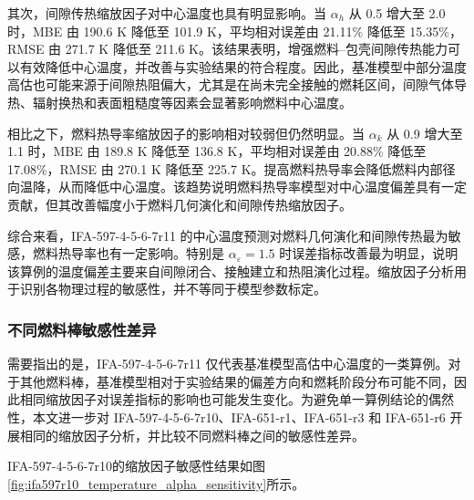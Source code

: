 其次，间隙传热缩放因子对中心温度也具有明显影响。当 \(\alpha_h\) 从 0.5 增大至 2.0 时，MBE 由 190.6 K 降低至 101.9 K，平均相对误差由 21.11\% 降低至 15.35\%，RMSE 由 271.7 K 降低至 211.6 K。该结果表明，增强燃料--包壳间隙传热能力可以有效降低中心温度，并改善与实验结果的符合程度。因此，基准模型中部分温度高估也可能来源于间隙热阻偏大，尤其是在尚未完全接触的燃耗区间，间隙气体导热、辐射换热和表面粗糙度等因素会显著影响燃料中心温度。

相比之下，燃料热导率缩放因子的影响相对较弱但仍然明显。当 \(\alpha_k\) 从 0.9 增大至 1.1 时，MBE 由 189.8 K 降低至 136.8 K，平均相对误差由 20.88\% 降低至 17.08\%，RMSE 由 270.1 K 降低至 225.7 K。提高燃料热导率会降低燃料内部径向温降，从而降低中心温度。该趋势说明燃料热导率模型对中心温度偏差具有一定贡献，但其改善幅度小于燃料几何演化和间隙传热缩放因子。

综合来看，IFA-597-4-5-6-7r11 的中心温度预测对燃料几何演化和间隙传热最为敏感，燃料热导率也有一定影响。特别是 \(\alpha_{\varepsilon}=1.5\) 时误差指标改善最为明显，说明该算例的温度偏差主要来自间隙闭合、接触建立和热阻演化过程。缩放因子分析用于识别各物理过程的敏感性，并不等同于模型参数标定。

\FloatBarrier
\subsubsection{不同燃料棒敏感性差异}
需要指出的是，IFA-597-4-5-6-7r11 仅代表基准模型高估中心温度的一类算例。对于其他燃料棒，基准模型相对于实验结果的偏差方向和燃耗阶段分布可能不同，因此相同缩放因子对误差指标的影响也可能发生变化。为避免单一算例结论的偶然性，本文进一步对 IFA-597-4-5-6-7r10、IFA-651-r1、IFA-651-r3 和 IFA-651-r6 开展相同的缩放因子分析，并比较不同燃料棒之间的敏感性差异。

IFA-597-4-5-6-7r10的缩放因子敏感性结果如图\ref{fig:ifa597r10_temperature_alpha_sensitivity}所示。


